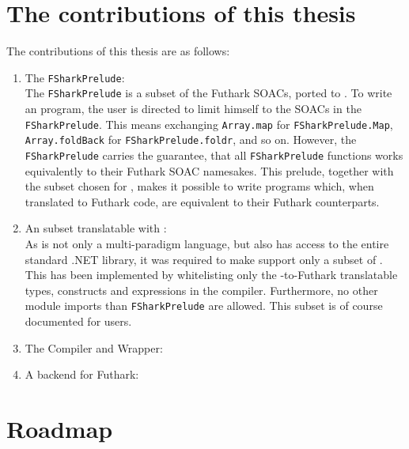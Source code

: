 \section{The contributions of this thesis}
The contributions of this thesis are as follows:
\begin{enumerate}
\item The \texttt{FSharkPrelude}:\\
  The \texttt{FSharkPrelude} is a subset of the Futhark SOACs, ported to
  \fsharp{}. To write an \fshark{} program, the user is directed to limit
  himself to the SOACs in the \texttt{FSharkPrelude}. This means exchanging
  \texttt{Array.map} for \texttt{FSharkPrelude.Map}, \texttt{Array.foldBack} for
  \texttt{FSharkPrelude.foldr}, and so on.
  However, the \texttt{FSharkPrelude} carries the guarantee, that all
  \texttt{FSharkPrelude} functions works equivalently to their Futhark SOAC namesakes. 
  This prelude, together with the \fsharp{} subset chosen for \fshark{}, makes
  it possible to write \fsharp{} programs which, when translated to Futhark
  code, are equivalent to their Futhark counterparts.

\item An \fsharp{} subset translatable with \fshark{}:\\
  As \fsharp{} is not only a multi-paradigm language, but also has access to the
  entire standard .NET library, it was required to make \fshark{} support only a
  subset of \fsharp{}. This has been implemented by whitelisting only the
  \fsharp{}-to-Futhark translatable types, constructs and expressions in the \fshark{}
  compiler. Furthermore, no other module imports than \texttt{FSharkPrelude} are allowed. 
  This subset is of course documented for users.

\item The \fshark{} Compiler and Wrapper:\\

\item A \csharp{} backend for Futhark:\\


\end{enumerate}


\section{Roadmap}








